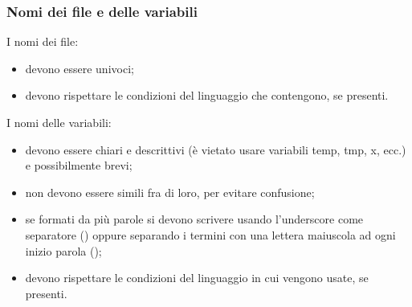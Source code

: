 \subsubsection{Nomi dei file e delle variabili}
I nomi dei file:
\begin{itemize}
    \item devono essere univoci;
    \item devono rispettare le condizioni del linguaggio che contengono, se presenti.
\end{itemize}
I nomi delle variabili:
\begin{itemize}
    \item devono essere chiari e descrittivi (è vietato usare variabili temp, tmp, x, ecc.) e possibilmente brevi;
    \item non devono essere simili fra di loro, per evitare confusione;
    \item se formati da più parole si devono scrivere usando l'underscore come separatore () oppure separando i termini con una lettera maiuscola ad ogni inizio parola ();
    \item devono rispettare le condizioni del linguaggio in cui vengono usate, se presenti.
\end{itemize}